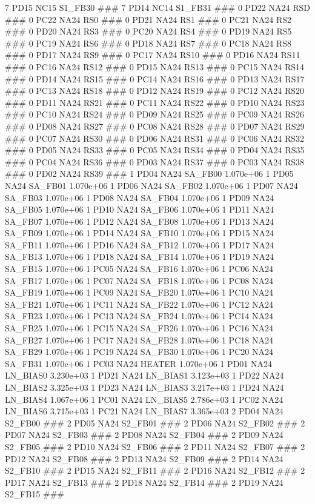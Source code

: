 7 PD15 NC15 S1_FB30 ### 
7 PD14 NC14 S1_FB31 ### 
0 PD22 NA24 RSD ### 
0 PC22 NA24 RS0 ### 
0 PD21 NA24 RS1 ### 
0 PC21 NA24 RS2 ### 
0 PD20 NA24 RS3 ### 
0 PC20 NA24 RS4 ### 
0 PD19 NA24 RS5 ### 
0 PC19 NA24 RS6 ### 
0 PD18 NA24 RS7 ### 
0 PC18 NA24 RS8 ### 
0 PD17 NA24 RS9 ### 
0 PC17 NA24 RS10 ### 
0 PD16 NA24 RS11 ### 
0 PC16 NA24 RS12 ### 
0 PD15 NA24 RS13 ### 
0 PC15 NA24 RS14 ### 
0 PD14 NA24 RS15 ### 
0 PC14 NA24 RS16 ### 
0 PD13 NA24 RS17 ### 
0 PC13 NA24 RS18 ### 
0 PD12 NA24 RS19 ### 
0 PC12 NA24 RS20 ### 
0 PD11 NA24 RS21 ### 
0 PC11 NA24 RS22 ### 
0 PD10 NA24 RS23 ### 
0 PC10 NA24 RS24 ### 
0 PD09 NA24 RS25 ### 
0 PC09 NA24 RS26 ### 
0 PD08 NA24 RS27 ### 
0 PC08 NA24 RS28 ### 
0 PD07 NA24 RS29 ### 
0 PC07 NA24 RS30 ### 
0 PD06 NA24 RS31 ### 
0 PC06 NA24 RS32 ### 
0 PD05 NA24 RS33 ### 
0 PC05 NA24 RS34 ### 
0 PD04 NA24 RS35 ### 
0 PC04 NA24 RS36 ### 
0 PD03 NA24 RS37 ### 
0 PC03 NA24 RS38 ### 
0 PD02 NA24 RS39 ### 
1 PD04 NA24 SA_FB00 1.070e+06 
1 PD05 NA24 SA_FB01 1.070e+06 
1 PD06 NA24 SA_FB02 1.070e+06 
1 PD07 NA24 SA_FB03 1.070e+06 
1 PD08 NA24 SA_FB04 1.070e+06 
1 PD09 NA24 SA_FB05 1.070e+06 
1 PD10 NA24 SA_FB06 1.070e+06 
1 PD11 NA24 SA_FB07 1.070e+06 
1 PD12 NA24 SA_FB08 1.070e+06 
1 PD13 NA24 SA_FB09 1.070e+06 
1 PD14 NA24 SA_FB10 1.070e+06 
1 PD15 NA24 SA_FB11 1.070e+06 
1 PD16 NA24 SA_FB12 1.070e+06 
1 PD17 NA24 SA_FB13 1.070e+06 
1 PD18 NA24 SA_FB14 1.070e+06 
1 PD19 NA24 SA_FB15 1.070e+06 
1 PC05 NA24 SA_FB16 1.070e+06 
1 PC06 NA24 SA_FB17 1.070e+06 
1 PC07 NA24 SA_FB18 1.070e+06 
1 PC08 NA24 SA_FB19 1.070e+06 
1 PC09 NA24 SA_FB20 1.070e+06 
1 PC10 NA24 SA_FB21 1.070e+06 
1 PC11 NA24 SA_FB22 1.070e+06 
1 PC12 NA24 SA_FB23 1.070e+06 
1 PC13 NA24 SA_FB24 1.070e+06 
1 PC14 NA24 SA_FB25 1.070e+06 
1 PC15 NA24 SA_FB26 1.070e+06 
1 PC16 NA24 SA_FB27 1.070e+06 
1 PC17 NA24 SA_FB28 1.070e+06 
1 PC18 NA24 SA_FB29 1.070e+06 
1 PC19 NA24 SA_FB30 1.070e+06 
1 PC20 NA24 SA_FB31 1.070e+06 
1 PC03 NA24 HEATER 1.070e+06 
1 PD01 NA24 LN_BIAS0 3.230e+03 
1 PD21 NA24 LN_BIAS1 3.123e+03 
1 PD22 NA24 LN_BIAS2 3.325e+03 
1 PD23 NA24 LN_BIAS3 3.217e+03 
1 PD24 NA24 LN_BIAS4 1.067e+06 
1 PC01 NA24 LN_BIAS5 2.786e+03 
1 PC02 NA24 LN_BIAS6 3.715e+03 
1 PC21 NA24 LN_BIAS7 3.365e+03 
2 PD04 NA24 S2_FB00 ### 
2 PD05 NA24 S2_FB01 ### 
2 PD06 NA24 S2_FB02 ### 
2 PD07 NA24 S2_FB03 ### 
2 PD08 NA24 S2_FB04 ### 
2 PD09 NA24 S2_FB05 ### 
2 PD10 NA24 S2_FB06 ### 
2 PD11 NA24 S2_FB07 ### 
2 PD12 NA24 S2_FB08 ### 
2 PD13 NA24 S2_FB09 ### 
2 PD14 NA24 S2_FB10 ### 
2 PD15 NA24 S2_FB11 ### 
2 PD16 NA24 S2_FB12 ### 
2 PD17 NA24 S2_FB13 ### 
2 PD18 NA24 S2_FB14 ### 
2 PD19 NA24 S2_FB15 ### 
